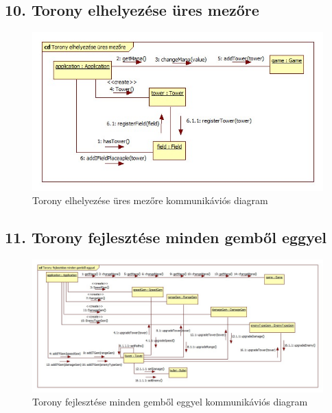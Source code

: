 \subsection{10. Torony elhelyezése üres mezőre}
\begin{figure}[H]
\begin{center}
\includegraphics[width=17cm]{chapters/chapter05/images/cd_Torony_elhelyezese_ures_mezore.jpg}
\caption{Torony elhelyezése üres mezőre kommunikáviós diagram}
\label{fig:cd_Torony_elhelyezese_ures_mezore}
\end{center}
\end{figure}

\subsection{11. Torony fejlesztése minden gemből eggyel}
\begin{figure}[H]
\begin{center}
\includegraphics[width=17cm]{chapters/chapter05/images/cd_Torony_fejlesztese_minden_gembol_eggyel.jpg}
\caption{Torony fejlesztése minden gemből eggyel kommunikáviós diagram}
\label{fig:cd_Torony_fejlesztese_minden_gembol_eggyel}
\end{center}
\end{figure}

